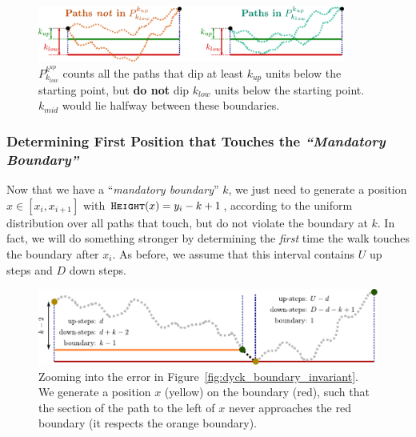 \vspace{2.5em}
\begin{figure}[htpb]
    \centering
    \includegraphics[width=0.9\textwidth]{images/dyck_mandatory_boundary.pdf}
    \caption{$P_{k_{low}}^{k^{up}}$ counts all the paths that dip at least $k_{up}$ units below the starting point,
    but \textbf{do not} dip $k_{low}$ units below the starting point. $k_{mid}$ would lie halfway between these boundaries.}
    \label{fig:dyck_mandatory_boundary}
\end{figure}



\subsubsection{Determining First Position that Touches the \emph{``Mandatory Boundary''}}
\label{sec:sampling_first_position_touching_mandatory_boundary}

Now that we have a ``\emph{mandatory boundary}'' $k$, we just need to generate a position $x\in[x_i,x_{i+1}]$ with $\texttt{\textsc{Height}}(x) = y_i-k+1$,
according to the uniform distribution over all paths that touch, but do not violate the boundary at $k$.
In fact, we will do something stronger by determining the \emph{first} time the walk touches the boundary after $x_i$.
As before, we assume that this interval contains $U$ up steps and $D$ down steps.
\begin{figure}[htpb]
    \centering
    \includegraphics[width=\textwidth]{images/dyck_first_approach_sampling.pdf}
    \caption{Zooming into the error in Figure~\ref{fig:dyck_boundary_invariant}.
        We generate a position $x$ (yellow) on the boundary (red),
        such that the section of the path to the left of $x$ never approaches the red boundary (it respects the orange boundary).}
    \label{fig:dyck_mandatory_boundary_sampling}
\end{figure}

